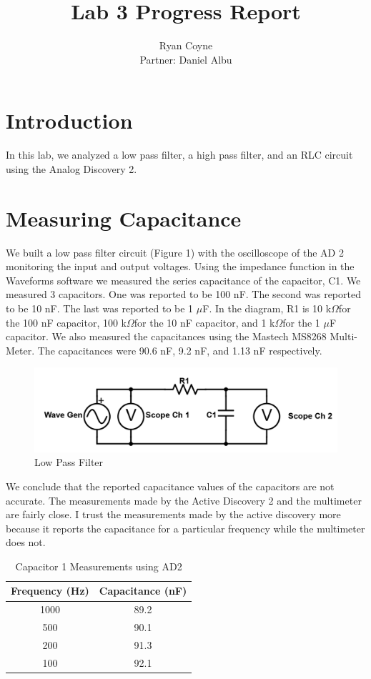 \documentclass{article}
\title{Lab 3 Progress Report}
\author{Ryan Coyne \\ Partner: Daniel Albu}
\renewcommand{\O}{\(\Omega\)}
\begin{document}
\maketitle

\section{Introduction}
In this lab, we analyzed a low pass filter, a high pass filter, and an RLC circuit using the Analog Discovery 2. 

\section{Measuring Capacitance}
We built a low pass filter circuit (Figure 1) with the oscilloscope of the AD 2 monitoring the input and output voltages. Using the impedance function in the Waveforms software we measured the series capacitance of the capacitor, C1. We measured 3 capacitors. One was reported to be 100 nF. The second was reported to be 10 nF. The last was reported to be 1 \(\mu\)F. In the diagram, R1 is 10 k\O for the 100 nF capacitor, 100 k\O for the 10 nF capacitor, and 1 k\O for the 1 \(\mu\)F capacitor. We also measured the capacitances using the Mastech MS8268 Multi-Meter. The capacitances were 90.6 nF, 9.2 nF, and 1.13 nF respectively. 

\begin{figure}[H]
    \centering
    \includegraphics[width = \linewidth]{Scheme-it-export-New-Project-2024-03-04-19-03.png}    
    \caption{Low Pass Filter}
\end{figure}

We conclude that the reported capacitance values of the capacitors are not accurate. The measurements made by the Active Discovery 2 and the multimeter are fairly close. I trust the measurements made by the active discovery more because it reports the capacitance for a particular frequency while the multimeter does not. 

\begin{table}[H]
    \centering
    \begin{tabular}{c|c}
        Frequency (Hz) & Capacitance (nF)\\
        \hline
        1000 & 89.2\\
        500 & 90.1\\
        200 & 91.3\\
        100 & 92.1\\
    \end{tabular}
    \caption{Capacitor 1 Measurements using AD2}
\end{table}
\end{document}
